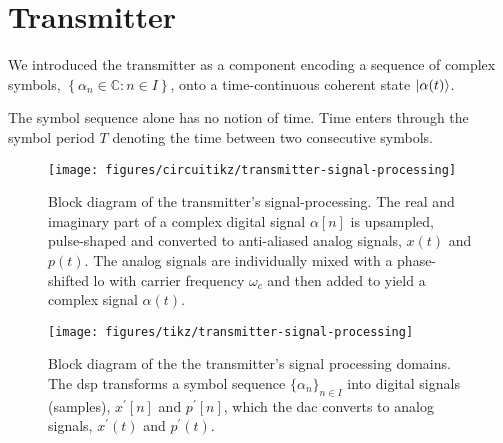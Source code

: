 \section{Transmitter}                                                                                                                                                                                                                                                                                                                                                                                                                                                                                                                                                                                                                                                                                                                     

We introduced the transmitter as a component encoding a sequence of complex symbols, $\left\{\alpha_n\in\mathbb{C}\colon n\in I\right\}$, onto a time-continuous coherent state $\lvert\alpha(t)\rangle$.

The symbol sequence alone has no notion of time.
Time enters through the symbol period $T$ denoting the time between two consecutive symbols.


\begin{figure}[htb]
	\centering
	\texttt{[image: figures/circuitikz/transmitter-signal-processing]}
	\caption{Block diagram of the transmitter's signal-processing. The real and imaginary part of a complex digital signal $\alpha[n]$ is upsampled, pulse-shaped and converted to anti-aliased analog signals, $x(t)$ and $p(t)$. The analog signals are individually mixed with a phase-shifted \gls{lo} with carrier frequency $\omega_c$ and then added to yield a complex signal $\alpha(t)$.}\label{fig:transmitter_signal_processing}
\end{figure}

\begin{figure}[htb]
	\centering
	\texttt{[image: figures/tikz/transmitter-signal-processing]}
	\caption{Block diagram of the the transmitter's signal processing domains. The \gls{dsp} transforms a symbol sequence $\{\alpha_n\}_{n\in I}$ into digital signals (samples), $x^\prime[n]$ and $p^\prime[n]$, which the \gls{dac} converts to analog signals, $x^\prime(t)$ and $p^\prime(t)$.}\label{fig:transmitter_signal_processing_domains}
\end{figure}

